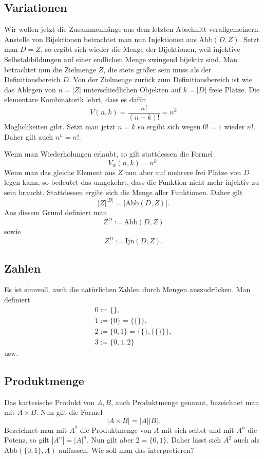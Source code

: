 \documentclass[a4paper,12pt,fleqn]{article}
\begin{document}
\subsection{Variationen}
Wir wollen jetzt die Zusammenhänge aus dem letzten Abschnitt
verallgemeinern. Anstelle von Bijektionen betrachtet man
nun Injektionen aus $\mathrm{Abb}(D,Z)$. Setzt man $D=Z$, so
ergibt sich wieder die Menge der Bijektionen, weil injektive
Selbstabbildungen auf einer endlichen Menge zwingend bijektiv
sind. Man betrachtet nun die Zielmenge $Z$, die stets größer sein
muss als der Definitionsbereich $D$. Von der Zielmenge zurück
zum Definitionsbereich ist wie das Ablegen von $n=|Z|$
unterschiedlichen Objekten auf $k=|D|$ freie Plätze. Die elementare
Kombinatorik lehrt, dass es dafür
\[V(n,k) = \frac{n!}{(n-k)!} = n^{\underline k}\]
Möglichkeiten gibt. Setzt man jetzt $n=k$ so ergibt sich wegen
$0!=1$ wieder $n!$. Daher gilt auch $n^{\underline n}=n!$.

Wenn man Wiederholungen erlaubt, so gilt stattdessen die
Formel
\[V_w(n,k) = n^k.\]
Wenn man das gleiche Element aus $Z$ nun aber auf mehrere
frei Plätze von $D$ legen kann, so bedeutet das umgekehrt,
dass die Funktion nicht mehr injektiv zu sein braucht.
Stattdessen ergibt sich die Menge aller Funktionen. Daher
gilt
\[|Z|^{|D|} = |\mathrm{Abb}(D,Z)|.\]
Aus diesem Grund definiert man
\[Z^D := \mathrm{Abb}(D,Z)\]
sowie
\[Z^{\underline D}:=\mathrm{Ijn}(D,Z).\]

\subsection{Zahlen}
Es ist sinnvoll, auch die natürlichen Zahlen durch Mengen
auszudrücken. Man definiert
\begin{gather*}
0:=\{\},\\
1:=\{0\} = \{\{\}\},\\
2:=\{0,1\} = \{\{\},\{\{\}\}\},\\
3:=\{0,1,2\}
\end{gather*}
usw.

\subsection{Produktmenge}
Das kartesische Produkt von $A,B$, auch Produktmenge genannt,
bezeichnet man mit $A\times B$. Nun gilt die Formel
\[|A\times B| = |A||B|.\]
Bezeichnet man mit $A^2$ die Produktmenge von $A$ mit sich selbst
und mit $A^n$ die Potenz, so gilt $|A^n|=|A|^n$. Nun gilt aber
$2=\{0,1\}$. Daher lässt sich $A^2$ auch als $\mathrm{Abb}(\{0,1\},A)$
auffassen. Wie soll man das interpretieren?
\end{document}
